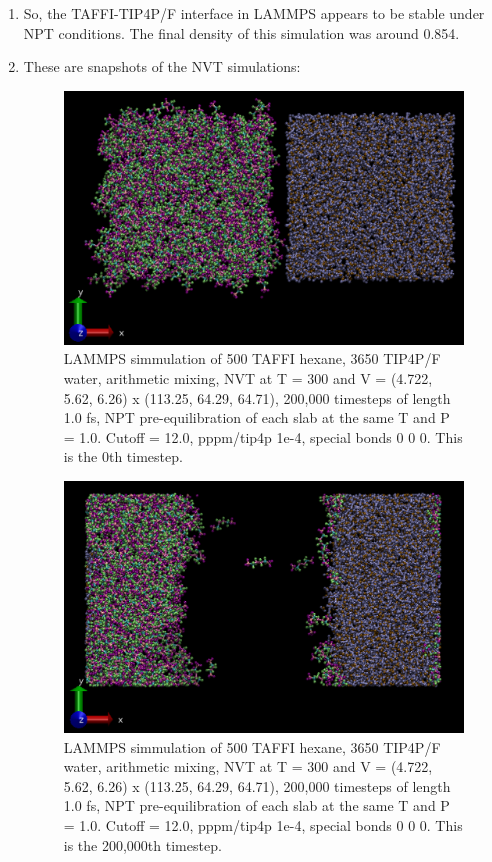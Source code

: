 \documentclass[12pt,reqno]{amsart}
\numberwithin{equation}{section}
\begin{document}
\begin{enumerate}
\item So, the TAFFI-TIP4P/F interface in LAMMPS appears to be stable under NPT conditions.  The final density of this simulation was around 0.854.  

\item These are snapshots of the NVT simulations: 

\begin{figure}[H]
\centering
\includegraphics[scale=0.4]{lammps_taffi-tip4pF_NVT_0}
\caption{LAMMPS simmulation of 500 TAFFI hexane, 3650 TIP4P/F water, arithmetic mixing, NVT at T = 300 and V = (4.722, 5.62, 6.26) x (113.25, 64.29, 64.71), 200,000 timesteps of length 1.0 fs, NPT pre-equilibration of each slab at the same T and P = 1.0.  Cutoff = 12.0, pppm/tip4p 1e-4, special bonds 0 0 0.  This is the 0th timestep.}
\end{figure}

\begin{figure}[H]
\centering
\includegraphics[scale=0.4]{lammps_taffi-tip4pF_NVT_200000}
\caption{LAMMPS simmulation of 500 TAFFI hexane, 3650 TIP4P/F water, arithmetic mixing, NVT at T = 300 and V = (4.722, 5.62, 6.26) x (113.25, 64.29, 64.71), 200,000 timesteps of length 1.0 fs, NPT pre-equilibration of each slab at the same T and P = 1.0.  Cutoff = 12.0, pppm/tip4p 1e-4, special bonds 0 0 0.  This is the 200,000th timestep.}
\end{figure}


\end{enumerate}
\end{document}
